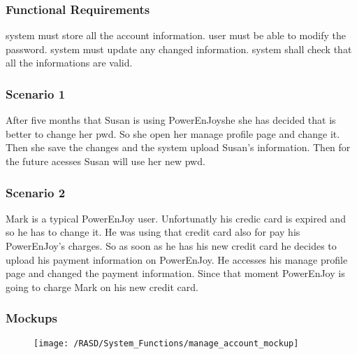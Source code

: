 \subsubsection{Functional Requirements}
\begin{itemize}
  \itemThe system must store all the account information.
  \itemThe user must be able to modify the password.
  \itemThe system must update any changed information.
  \itemThe system shall check that all the informations are valid.
\end{itemize}

\subsubsection{Scenario 1}
After five months that Susan is using PowerEnJoyshe she has decided that is better to change her \gls{pwd}. So she open her manage profile page and change it. Then she save the changes and the system upload Susan's information. Then for the future acesses Susan will use her new \gls{pwd}.

\subsubsection{Scenario 2}
Mark is a typical PowerEnJoy user. Unfortunatly his credic card is expired and so he has to change it. He was using that credit card also for pay his PowerEnJoy's charges. So as soon as he has his new credit card he decides to upload his payment information on PowerEnJoy. He accesses his manage profile page and changed the payment information. Since that moment PowerEnJoy is going to charge Mark on his new credit card.



\subsubsection{Mockups}
\begin{figure}[!ht]
  \centering
  \vspace{0.2cm}
  \texttt{[image: /RASD/System\_Functions/manage\_account\_mockup]}\\
  \vspace{0.4cm}
  \label{fig:manage_account_mockup} 
\end{figure}


